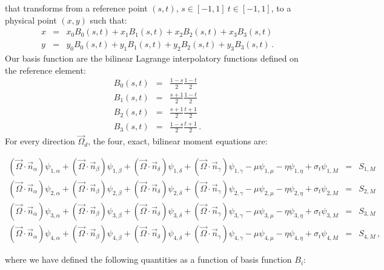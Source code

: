 \documentclass{mc2015}
\newcommand{\beanum}{\begin{eqnarray}}  %
\newcommand{\eeanum}{\end{eqnarray}}
\newcommand{\B}[1]{\ensuremath{{B_{#1} }}}
\newcommand{\omg}{\ensuremath{\vec{\Omega}}}
\newcommand{\pec}{\, ,}
\newcommand{\pep}{\, .}
\begin{document}
that transforms from a reference point $(s,t)$, $s\in[-1,1]~t\in[-1,1]$, to a physical point $(x,y)$ such that:
\beanum
x &=& x_0 \B{0}(s,t) + x_1 \B{1}(s,t) + x_2 \B{2}(s,t) + x_3 \B{3}(s,t) \\
y &=&  y_0 \B{0}(s,t) + y_1 \B{1}(s,t) + y_2 \B{2}(s,t) + y_3 \B{3}(s,t) \pep
\eeanum
Our basis function are the bilinear Lagrange interpolatory functions defined on the reference element:
\begin{subequations}
\beanum
\B{0}(s,t) &=& \frac{1-s}{2}\frac{1-t}{2} \\
\B{1}(s,t) &=& \frac{s+1}{2}\frac{1-t}{2} \\
\B{2}(s,t) &=& \frac{s+1}{2}\frac{t+1}{2} \\
\B{3}(s,t) &=& \frac{1-s}{2}\frac{t+1}{2}  \pep
\eeanum
\end{subequations}
For every direction $\omg_d$, the four, exact, bilinear moment equations are:
\begin{small}
\begin{subequations}
\label{eq:mom_eqs}
\beanum
(\omg \cdot \vec{n}_{\alpha})\psi_{1,\alpha} + 
(\omg \cdot \vec{n}_{\beta})\psi_{1,\beta} + (\omg \cdot \vec{n}_{\delta})\psi_{1,\delta}+
(\omg \cdot \vec{n}_{\gamma})\psi_{1,\gamma} - \mu \psi_{1,\mu} - \eta \psi_{1,\eta} + \sigma_t\psi_{1,M} &=& S_{1,M} \\
%
%
(\omg \cdot \vec{n}_{\alpha})\psi_{2,\alpha} + 
(\omg \cdot \vec{n}_{\beta})\psi_{2,\beta} + (\omg \cdot \vec{n}_{\delta})\psi_{2,\delta}+
(\omg \cdot \vec{n}_{\gamma})\psi_{2,\gamma} - \mu \psi_{2,\mu} - \eta \psi_{2,\eta} + \sigma_t\psi_{2,M} &=& S_{2,M} \\
%
%
(\omg \cdot \vec{n}_{\alpha})\psi_{3,\alpha} + 
(\omg \cdot \vec{n}_{\beta})\psi_{3,\beta} + (\omg \cdot \vec{n}_{\delta})\psi_{3,\delta}+
(\omg \cdot \vec{n}_{\gamma})\psi_{3,\gamma} - \mu \psi_{3,\mu} - \eta \psi_{3,\eta} + \sigma_t\psi_{3,M} &=& S_{3,M} \\
%
%
(\omg \cdot \vec{n}_{\alpha})\psi_{4,\alpha} + 
(\omg \cdot \vec{n}_{\beta})\psi_{4,\beta} + (\omg \cdot \vec{n}_{\delta})\psi_{4,\delta}+
(\omg \cdot \vec{n}_{\gamma})\psi_{4,\gamma} - \mu \psi_{4,\mu} - \eta \psi_{4,\eta} + \sigma_t\psi_{4,M} &=& S_{4,M} \pec
\eeanum
\end{subequations}
\end{small}
where we have defined the following quantities as a function of basis function \B{i}:
\end{document}
